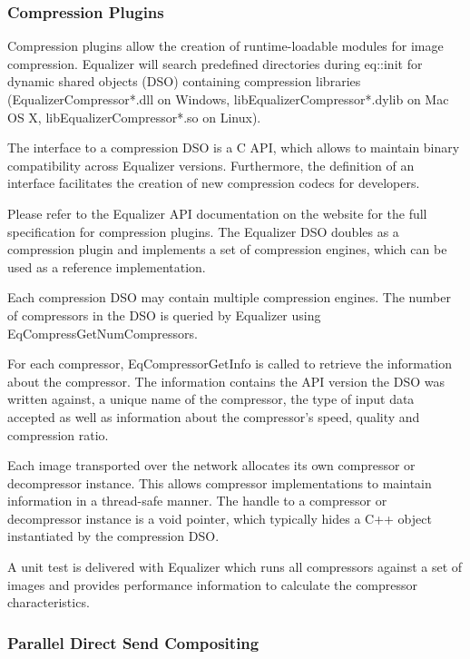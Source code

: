 \documentclass[10pt,a4]{scrartcl}
\begin{document}
\subsubsection{Compression Plugins}

Compression plugins allow the creation of runtime-loadable modules for
image compression. Equalizer will search predefined directories during
\textsf{eq::init} for dynamic shared objects (DSO) containing compression
libraries (EqualizerCompressor*.dll on Windows, libEqualizerCompressor*.dylib
on Mac OS X, libEqualizerCompressor*.so on Linux).

The interface to a compression DSO is a C API, which allows to maintain
binary compatibility across Equalizer versions. Furthermore, the
definition of an interface facilitates the creation of new compression
codecs for developers. 

Please refer to the Equalizer API documentation on the website for the
full specification for compression plugins. The Equalizer DSO doubles as
a compression plugin and implements a set of compression engines, which
can be used as a reference implementation.

Each compression DSO may contain multiple compression engines. The
number of compressors in the DSO is queried by Equalizer using
\textsf{EqCompressGetNumCompressors}. 

For each compressor, \textsf{EqCompressorGetInfo} is called to retrieve
the information about the compressor. The information contains the API
version the DSO was written against, a unique name of the compressor,
the type of input data accepted as well as information about the
compressor's speed, quality and compression ratio.

Each image transported over the network allocates its own compressor or
decompressor instance. This allows compressor implementations to
maintain information in a thread-safe manner. The handle to a compressor
or decompressor instance is a void pointer, which typically hides a C++
object instantiated by the compression DSO.

A unit test is delivered with Equalizer which runs all compressors
against a set of images and provides performance information to
calculate the compressor characteristics.



\subsubsection{\label{sDirectSend}Parallel Direct Send Compositing}
\end{document}
